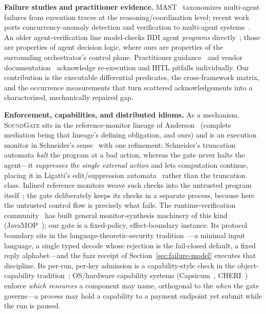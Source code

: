 \documentclass[10pt,journal,compsoc]{IEEEtran}
\newcommand{\sys}{\textsc{SoundGate}}
\begin{document}
\textbf{Failure studies and practitioner evidence.} MAST~\cite{mast25}
taxonomizes multi-agent failures from execution traces at the
reasoning/coordination level; recent work ports concurrency-anomaly detection
and verification to multi-agent systems~\cite{khan26}. An older
agent-verification line model-checks BDI agent \emph{programs}
directly~\cite{ajpf12}; those are properties of agent decision logic, where
ours are properties of the surrounding orchestrator's control plane. Practitioner
guidance~\cite{abstractalg26} and vendor documentation~\cite{lgdocs26}
acknowledge re-execution and HITL pitfalls individually. Our contribution is
the executable differential predicates, the cross-framework matrix, and the
occurrence measurements that turn scattered acknowledgements into a
characterized, mechanically repaired gap.

\textbf{Enforcement, capabilities, and distributed idioms.} As a mechanism,
\sys{} sits in the reference-monitor lineage of Anderson~\cite{anderson72}
(complete mediation being that lineage's defining obligation, and ours) and is
an execution monitor in Schneider's sense~\cite{schneider00} with one
refinement: Schneider's truncation automata \emph{halt} the program at a bad
action, whereas the gate never halts the agent---it \emph{suppresses the single
external action} and lets computation continue, placing it in Ligatti's
edit/suppression automata~\cite{ligatti05} rather than the truncation class.
Inlined reference monitors weave such checks into the untrusted program
itself~\cite{erlingsson00}; the gate deliberately keeps its checks in a
separate process, because here the untrusted control flow is precisely what
fails.
The runtime-verification community~\cite{leucker09} has built general
monitor-synthesis machinery of this kind (JavaMOP~\cite{javamop12}); our gate
is a fixed-policy, effect-boundary instance. Its protocol boundary sits in the
language-theoretic-security tradition~\cite{langsec16}---a minimal input
language, a single typed decode whose rejection is the fail-closed default, a
fixed reply alphabet---and the fuzz receipt of Section~\ref{sec:failure-model}
executes that discipline. Its per-run, per-key admission is a capability-style check in the object-capability tradition~\cite{miller06}; OS/hardware capability systems (Capsicum~\cite{capsicum10}, CHERI~\cite{cheri15}) enforce \emph{which resources} a component may name, orthogonal to the \emph{when} the gate governs---a process may hold a capability to a payment endpoint yet submit while the run is paused.
\end{document}
